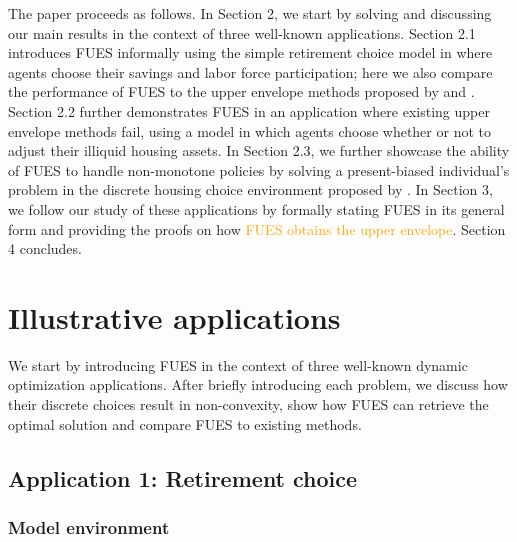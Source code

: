 \documentclass[12pt]{article}
\begin{document}
The paper proceeds as follows. In Section 2, we start by solving and discussing our main results in the context of three well-known applications. Section 2.1 introduces FUES informally using the simple retirement choice model in \cite{Iskhakov2017} where agents choose their savings and labor force participation; here we also compare the performance of FUES to the upper envelope methods proposed by \cite{Iskhakov2017} and \cite{Druedahl2017}.  Section 2.2 further demonstrates FUES in an application where existing upper envelope methods fail, using a model in which agents choose whether or not to adjust their illiquid housing assets. In Section 2.3, we further showcase the ability of FUES to handle non-monotone policies by solving a present-biased individual's problem in the discrete housing choice environment proposed by \cite{Fella2014}. In Section 3, we follow our study of these applications by formally stating FUES in its general form and providing the proofs on how \textcolor{orange}{FUES obtains the upper envelope}. Section 4 concludes.


\section{Illustrative applications}\label{sec: Applications}

We start by introducing FUES in the context of three well-known dynamic optimization applications. After briefly introducing each problem, we discuss how their discrete choices result in non-convexity, show how FUES can retrieve the optimal solution and compare FUES to existing methods. 


\subsection{Application 1: Retirement choice}\label{sec: retchoice}

\subsubsection{Model environment}
\end{document}

